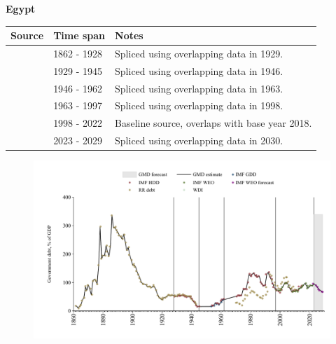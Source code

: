 \documentclass[12pt,a4paper,landscape]{article}
\begin{document}
\begin{adjustbox}{max totalsize={\paperwidth}{\paperheight},center}
\begin{minipage}[t][\textheight][t]{\textwidth}
\vspace*{0.5cm}
{}
\begin{center}
{\Large\bfseries Egypt}
\end{center}
\vspace{0.5cm}
\begin{table}[H]
\centering
\small
\begin{tabular}{|l|l|l|}
\hline
\textbf{Source} & \textbf{Time span} & \textbf{Notes} \\
\hline
\rowcolor{white}\cite{RR_debt}& 1862 - 1928 &Spliced using overlapping data in 1929.\\
\rowcolor{lightgray}\cite{IMF_HDD}& 1929 - 1945 &Spliced using overlapping data in 1946.\\
\rowcolor{white}\cite{IMF_GDD}& 1946 - 1962 &Spliced using overlapping data in 1963.\\
\rowcolor{lightgray}\cite{IMF_HDD}& 1963 - 1997 &Spliced using overlapping data in 1998.\\
\rowcolor{white}\cite{IMF_WEO}& 1998 - 2022 &Baseline source, overlaps with base year 2018.\\
\rowcolor{lightgray}\cite{IMF_WEO_forecast}& 2023 - 2029 &Spliced using overlapping data in 2030.\\
\hline
\end{tabular}
\end{table}
\begin{figure}[H]
\centering
\includegraphics[width=\textwidth,height=0.6\textheight,keepaspectratio]{graphs/EGY_govdebt_GDP.pdf}
\end{figure}
\end{minipage}
\end{adjustbox}
\end{document}
